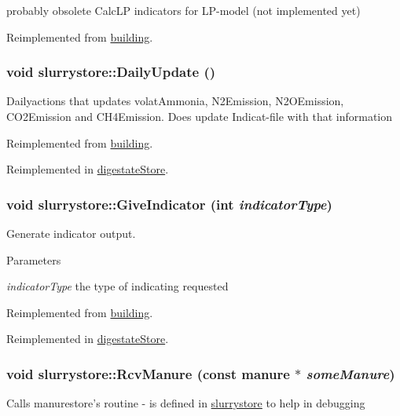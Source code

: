 probably obsolete CalcLP indicators for LP-\/model (not implemented yet) 

Reimplemented from \hyperlink{classbuilding_af1f27cbf72295547af61edc9e02a7e61}{building}.\hypertarget{classslurrystore_a0e660eb43b403bef8aaefb8188a73d4f}{
\subsubsection[{DailyUpdate}]{\setlength{\rightskip}{0pt plus 5cm}void slurrystore::DailyUpdate ()}}
\label{classslurrystore_a0e660eb43b403bef8aaefb8188a73d4f}
Dailyactions that updates volatAmmonia, N2Emission, N2OEmission, CO2Emission and CH4Emission. Does update Indicat-\/file with that information 

Reimplemented from \hyperlink{classbuilding_a584ba300427d2a648f478b68065b7a18}{building}.

Reimplemented in \hyperlink{classdigestate_store_a209611f25ea14ad07c9de42fa46eea05}{digestateStore}.\hypertarget{classslurrystore_a982183d9d72019736bfdb792c4cb5d78}{
\subsubsection[{GiveIndicator}]{\setlength{\rightskip}{0pt plus 5cm}void slurrystore::GiveIndicator (int {\em indicatorType})}}
\label{classslurrystore_a982183d9d72019736bfdb792c4cb5d78}


Generate indicator output. 
\begin{DoxyParams}{Parameters}
\item[{\em indicatorType}]the type of indicating requested \end{DoxyParams}


Reimplemented from \hyperlink{classbuilding_ae0e21d6fc26978c65a980676ddf4fcdf}{building}.

Reimplemented in \hyperlink{classdigestate_store_ae1402687e7bf67b150bf01e97c4798b9}{digestateStore}.\hypertarget{classslurrystore_af99a5bbcf35c6845fcf989809c5347fa}{
\subsubsection[{RcvManure}]{\setlength{\rightskip}{0pt plus 5cm}void slurrystore::RcvManure (const {\bf manure} $\ast$ {\em someManure})}}
\label{classslurrystore_af99a5bbcf35c6845fcf989809c5347fa}
Calls manurestore's routine -\/ is defined in \hyperlink{classslurrystore}{slurrystore} to help in debugging 

